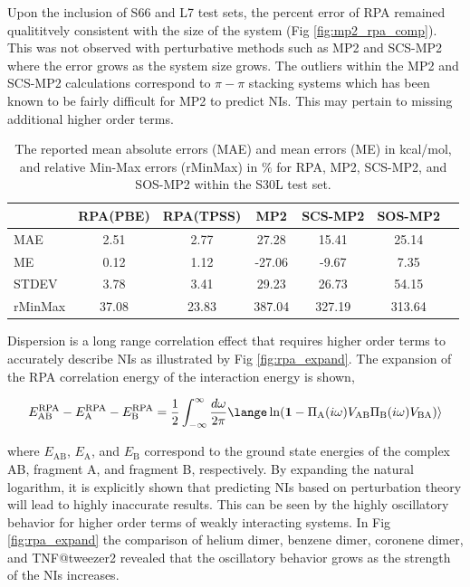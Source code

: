 \documentclass[twoside,twocolumn,9pt]{article}
\begin{document}
Upon the inclusion of S66 and L7 test sets, the percent error of RPA
remained qualititvely consistent with the size of the system (Fig
\ref{fig:mp2_rpa_comp}). This was not observed with perturbative
methods such as MP2 and SCS-MP2 where the error grows as the system
size grows. The outliers within the MP2 and SCS-MP2 calculations
correspond to $\pi-\pi$ stacking systems which has been known to
be fairly difficult for MP2 to predict NIs. This may pertain to missing
additional higher order terms.

\begin{table}[h]
  \caption{The reported mean absolute errors (MAE) and mean
    errors (ME) in kcal/mol, and relative Min-Max errors (rMinMax)
    in $\%$ for RPA, MP2, SCS-MP2, and SOS-MP2 within the S30L test set.
  }
  \label{tbl:s30l}
  \setlength{\tabcolsep}{2.7pt}
  \begin{tabular*}{0.48\textwidth}{@{\extracolsep{\fill}}lcccccc}
    \hline
    & RPA(PBE) & RPA(TPSS) & MP2 & SCS-MP2 & SOS-MP2 \\
    \hline
    MAE     & 2.51     & 2.77     & 27.28    & 15.41    & 25.14     \\
    ME      & 0.12     & 1.12     & -27.06   & -9.67    & 7.35      \\
    STDEV   & 3.78     & 3.41     & 29.23    & 26.73    & 54.15     \\
    rMinMax & 37.08    & 23.83    & 387.04   & 327.19   & 313.64    \\
    \hline
  \end{tabular*}
\end{table}

Dispersion is a long range correlation effect that requires higher
order terms to accurately describe NIs as illustrated by Fig \ref{fig:rpa_expand}.
The expansion of the RPA correlation energy of the interaction energy
is shown,

\begin{equation}
  E^{\text{RPA}}_{\text{AB}} - E^{\text{RPA}}_{\text{A}} - E^{\text{RPA}}_{\text{B}}
  = \frac{1}{2}\int^{\infty}_{-\infty} \frac{d\omega}{2\pi}
  \lange \ln(\mathbf{1} - \Pi_{\text{A}}(i\omega)V_{\text{AB}}\Pi_{\text{B}}(i\omega)V_{\text{BA}}) \rangle
  \label{eqn:expand}
\end{equation}

\noindent where $E_{\text{AB}}$, $E_{\text{A}}$, and $E_{\text{B}}$ correspond
to the ground state energies of the complex AB, fragment A, and fragment B,
respectively. By expanding the natural logarithm, it is explicitly shown
that predicting NIs based on perturbation theory will lead to highly
inaccurate results. This can be seen by the highly oscillatory behavior
for higher order terms of weakly interacting systems. In Fig \ref{fig:rpa_expand}
the comparison of helium dimer, benzene dimer, coronene dimer, and
TNF@tweezer2 revealed that the oscillatory behavior grows as the
strength of the NIs increases.
\end{document}
